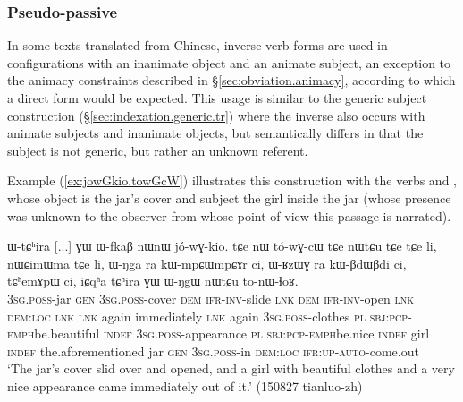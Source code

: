 
\subsubsection{Pseudo-passive} \label{sec:pseudo.passive}
In some texts translated from Chinese, inverse verb forms are used in configurations with an inanimate object and an animate subject, an exception to the animacy constraints described in §\ref{sec:obviation.animacy}, according to which a direct form would be expected. This usage is similar to the generic subject construction (§\ref{sec:indexation.generic.tr}) where the inverse also occurs with animate subjects and inanimate objects, but semantically differs in that the subject is not generic, but rather an unknown referent. 

Example (\ref{ex:jowGkio.towGcW}) illustrates this construction with the verbs  and , whose object is the jar's cover and subject the girl inside the jar (whose presence was unknown to the observer from whose point of view this passage is narrated). 
\largerpage
\begin{exe}
\ex \label{ex:jowGkio.towGcW}
\gll ɯ-tɕʰira [...] ɣɯ ɯ-fkaβ nɯnɯ jó-wɣ-kio. tɕe nɯ tó-wɣ-cɯ tɕe nɯtɕu tɕe tɕe li, nɯɕimɯma tɕe li,  ɯ-ŋga ra kɯ-mpɕɯ\redp{}mpɕɤr ci, ɯ-ʁzɯɣ ra kɯ-βdɯ\redp{}βdi ci, tɕʰemɤpɯ ci, iɕqʰa tɕʰira ɣɯ ɯ-ŋgɯ nɯtɕu to-nɯ-ɬoʁ.\\
\textsc{3sg}.\textsc{poss}-jar { } \textsc{gen} \textsc{3sg}.\textsc{poss}-cover \textsc{dem} \textsc{ifr}-\textsc{inv}-slide \textsc{lnk} \textsc{dem} \textsc{ifr}-\textsc{inv}-open \textsc{lnk} \textsc{dem}:\textsc{loc} \textsc{lnk} \textsc{lnk} again immediately \textsc{lnk} again \textsc{3sg}.\textsc{poss}-clothes \textsc{pl} \textsc{sbj}:\textsc{pcp}-\textsc{emph}\redp{}be.beautiful \textsc{indef} \textsc{3sg}.\textsc{poss}-appearance \textsc{pl} \textsc{sbj}:\textsc{pcp}-\textsc{emph}\redp{}be.nice  \textsc{indef} girl \textsc{indef} the.aforementioned jar \textsc{gen} \textsc{3sg}.\textsc{poss}-in \textsc{dem}:\textsc{loc} \textsc{ifr}:\textsc{up}-\textsc{auto}-come.out \\
\glt `The jar's cover slid over and opened, and a girl with beautiful clothes and a very nice appearance came immediately out of it.' (150827 tianluo-zh)
\end{exe}


